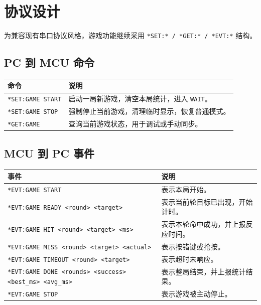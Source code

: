 \documentclass[main.tex]{subfiles}
\begin{document}
\section{协议设计}

为兼容现有串口协议风格，游戏功能继续采用 \texttt{*SET:* / *GET:* / *EVT:*} 结构。

\subsection{PC 到 MCU 命令}

\begin{center}
\begin{tabular}{p{3.2cm}p{10.4cm}}
\toprule
命令 & 说明 \\
\midrule
\texttt{*SET:GAME START} & 启动一局新游戏，清空本局统计，进入 \texttt{WAIT}。 \\
\texttt{*SET:GAME STOP} & 强制停止当前游戏，清理临时显示，恢复普通模式。 \\
\texttt{*GET:GAME} & 查询当前游戏状态，用于调试或手动同步。 \\
\bottomrule
\end{tabular}
\end{center}

\subsection{MCU 到 PC 事件}

\begin{center}
\begin{tabular}{p{4.2cm}p{9.4cm}}
\toprule
事件 & 说明 \\
\midrule
\texttt{*EVT:GAME START} & 表示本局开始。 \\
\texttt{*EVT:GAME READY <round> <target>} & 表示当前轮目标已出现，开始计时。 \\
\texttt{*EVT:GAME HIT <round> <target> <ms>} & 表示本轮命中成功，并上报反应时间。 \\
\texttt{*EVT:GAME MISS <round> <target> <actual>} & 表示按错键或抢按。 \\
\texttt{*EVT:GAME TIMEOUT <round> <target>} & 表示超时未响应。 \\
\texttt{*EVT:GAME DONE <rounds> <success> <best\_ms> <avg\_ms>} & 表示整局结束，并上报统计结果。 \\
\texttt{*EVT:GAME STOP} & 表示游戏被主动停止。 \\
\bottomrule
\end{tabular}
\end{center}
\end{document}
